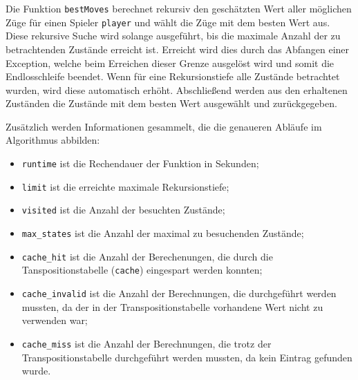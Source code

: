 \documentclass[11pt]{article}
\providecommand{\tightlist}{%
      \setlength{\itemsep}{0pt}\setlength{\parskip}{0pt}}
\begin{document}
Die Funktion \texttt{bestMoves} berechnet rekursiv den geschätzten Wert
aller möglichen Züge für einen Spieler \texttt{player} und wählt die
Züge mit dem besten Wert aus. Diese rekursive Suche wird solange
ausgeführt, bis die maximale Anzahl der zu betrachtenden Zustände
erreicht ist. Erreicht wird dies durch das Abfangen einer Exception,
welche beim Erreichen dieser Grenze ausgelöst wird und somit die
Endlosschleife beendet. Wenn für eine Rekursionstiefe alle Zustände
betrachtet wurden, wird diese automatisch erhöht. Abschließend werden
aus den erhaltenen Zuständen die Zustände mit dem besten Wert ausgewählt
und zurückgegeben.

Zusätzlich werden Informationen gesammelt, die die genaueren Abläufe im
Algorithmus abbilden:

\begin{itemize}
\tightlist
\item
  \texttt{runtime} ist die Rechendauer der Funktion in Sekunden;
\item
  \texttt{limit} ist die erreichte maximale Rekursionstiefe;
\item
  \texttt{visited} ist die Anzahl der besuchten Zustände;
\item
  \texttt{max\_states} ist die Anzahl der maximal zu besuchenden
  Zustände;
\item
  \texttt{cache\_hit} ist die Anzahl der Berechenungen, die durch die
  Tanspositionstabelle (\texttt{cache}) eingespart werden konnten;
\item
  \texttt{cache\_invalid} ist die Anzahl der Berechnungen, die
  durchgeführt werden mussten, da der in der Transpositionstabelle
  vorhandene Wert nicht zu verwenden war;
\item
  \texttt{cache\_miss} ist die Anzahl der Berechnungen, die trotz der
  Transpositionstabelle durchgeführt werden mussten, da kein Eintrag
  gefunden wurde.
\end{itemize}
\end{document}

